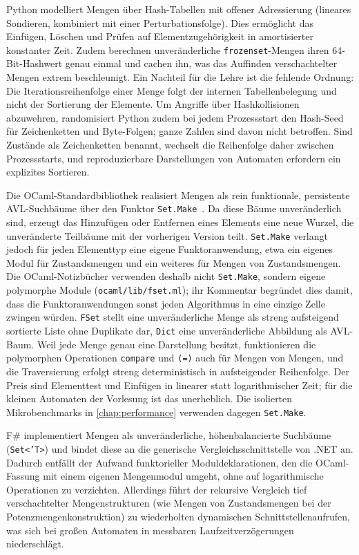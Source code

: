 Python modelliert Mengen über Hash-Tabellen mit offener Adressierung (lineares Sondieren, kombiniert mit einer Perturbationsfolge).
Dies ermöglicht das Einfügen, Löschen und Prüfen auf Elementzugehörigkeit in amortisierter konstanter Zeit.
Zudem berechnen unveränderliche \texttt{frozenset}-Mengen ihren 64-Bit-Hashwert genau einmal und cachen ihn, was das Auffinden verschachtelter Mengen extrem beschleunigt.
Ein Nachteil für die Lehre ist die fehlende Ordnung: Die Iterationsreihenfolge einer Menge folgt der internen Tabellenbelegung und nicht der Sortierung der Elemente.
Um Angriffe über Hashkollisionen abzuwehren, randomisiert Python zudem bei jedem Prozessstart den Hash-Seed für Zeichenketten und Byte-Folgen; ganze Zahlen sind davon nicht betroffen.
Sind Zustände als Zeichenketten benannt, wechselt die Reihenfolge daher zwischen Prozessstarts, und reproduzierbare Darstellungen von Automaten erfordern ein explizites Sortieren.

Die OCaml-Standardbibliothek realisiert Mengen als rein funktionale, persistente AVL-Suchbäume über den Funktor \texttt{Set.Make}~\cite{okasaki1999purely}.
Da diese Bäume unveränderlich sind, erzeugt das Hinzufügen oder Entfernen eines Elements eine neue Wurzel, die unveränderte Teilbäume mit der vorherigen Version teilt.
\texttt{Set.Make} verlangt jedoch für jeden Elementtyp eine eigene Funktoranwendung, etwa ein eigenes Modul für Zustandsmengen und ein weiteres für Mengen von Zustandsmengen.
Die OCaml-Notizbücher verwenden deshalb nicht \texttt{Set.Make}, sondern eigene polymorphe Module (\texttt{ocaml/lib/fset.ml}); ihr Kommentar begründet dies damit, dass die Funktoranwendungen sonst jeden Algorithmus in eine einzige Zelle zwingen würden.
\texttt{FSet} stellt eine unveränderliche Menge als streng aufsteigend sortierte Liste ohne Duplikate dar, \texttt{Dict} eine unveränderliche Abbildung als AVL-Baum.
Weil jede Menge genau eine Darstellung besitzt, funktionieren die polymorphen Operationen \texttt{compare} und \texttt{(=)} auch für Mengen von Mengen, und die Traversierung erfolgt streng deterministisch in aufsteigender Reihenfolge.
Der Preis sind Elementtest und Einfügen in linearer statt logarithmischer Zeit; für die kleinen Automaten der Vorlesung ist das unerheblich.
Die isolierten Mikrobenchmarks in \cref{chap:performance} verwenden dagegen \texttt{Set.Make}.

F\# implementiert Mengen als unveränderliche, höhenbalancierte Suchbäume (\texttt{Set<'T>}) und bindet diese an die generische Vergleichsschnittstelle von .NET an.
Dadurch entfällt der Aufwand funktorieller Moduldeklarationen, den die OCaml-Fassung mit einem eigenen Mengenmodul umgeht, ohne auf logarithmische Operationen zu verzichten.
Allerdings führt der rekursive Vergleich tief verschachtelter Mengenstrukturen (wie Mengen von Zustandsmengen bei der Potenzmengenkonstruktion) zu wiederholten dynamischen Schnittstellenaufrufen, was sich bei großen Automaten in messbaren Laufzeitverzögerungen niederschlägt.

